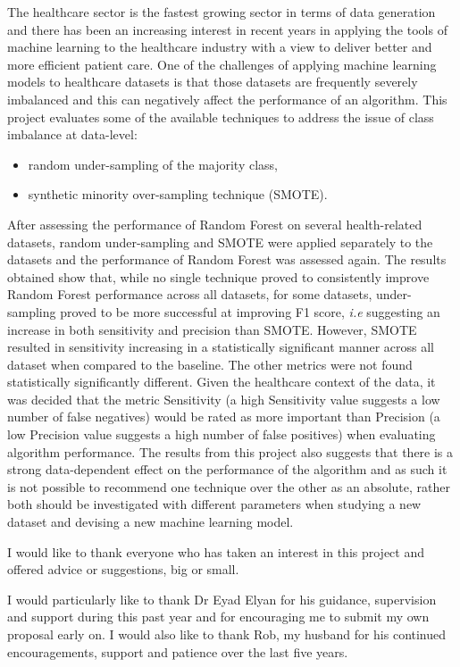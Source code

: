 \beforeabstract
{}

The healthcare sector is the fastest growing sector in terms of data generation and there has been an increasing interest in recent years in applying the tools of machine learning to the healthcare industry with a view to deliver better and more efficient patient care.\newline
One of the challenges of applying machine learning models to healthcare datasets is that those datasets are frequently severely imbalanced and this can negatively affect the performance of an algorithm.\newline
This project evaluates some of the available techniques to address the issue of class imbalance at data-level:
\begin{itemize}
    \item random under-sampling of the majority class,
    \item  synthetic minority over-sampling technique (SMOTE).
\end{itemize}

After assessing the performance of Random Forest on several health-related datasets, random under-sampling and SMOTE were applied separately to the datasets and the performance of Random Forest was assessed again.
The results obtained show that, while no single technique proved to consistently improve Random Forest performance across all datasets, for some datasets, under-sampling proved to be more successful at improving F1 score, \textit{i.e} suggesting an increase in both sensitivity and precision than SMOTE. However, SMOTE resulted in sensitivity increasing in a statistically significant manner across all dataset when compared to the baseline. The other metrics were not found statistically significantly different.\newline
Given the healthcare context of the data, it was decided that the metric Sensitivity (a high Sensitivity value suggests a low number of false negatives) would be rated as more important than Precision (a low Precision value suggests a high number of false positives) when evaluating algorithm performance.\newline
The results from this project also suggests that there is a strong data-dependent effect on the performance of the algorithm and as such it is not possible to recommend one technique over the other as an absolute, rather both should be investigated with different parameters when studying a new dataset and devising a new machine learning model.\newline





I would like to thank everyone who has taken an interest in this project and offered advice or suggestions, big or small. 

I would particularly like to thank Dr Eyad Elyan for his guidance, supervision and support during this past year and for encouraging me to submit my own proposal early on.
I would also like to thank Rob, my husband for his continued encouragements, support and patience over the last five years.


\afterpreface \afterabstract
